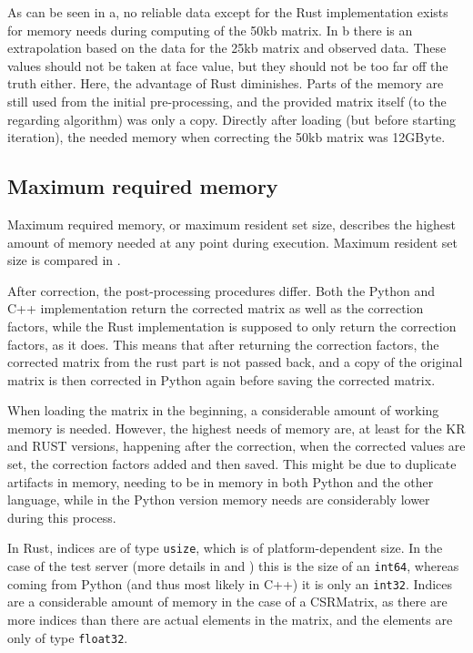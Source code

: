 As can be seen in a, no reliable data except for the Rust
implementation exists for memory needs during computing of the 50kb matrix. In
b there is an extrapolation based on the data for the
25kb matrix and observed data. These values should not be taken at face value,
but they should not be too far off the truth either. Here, the advantage of Rust
diminishes. Parts of the memory are still used from the initial pre-processing,
and the provided matrix itself (to the regarding algorithm) was only a copy.
Directly after loading (but before starting iteration), the needed memory when
correcting the 50kb matrix was 12GByte.


\subsection{Maximum required memory}\label{sec:maxmem}



Maximum required memory, or maximum resident set size, describes the highest
amount of memory needed at any point during execution. Maximum resident set size
is compared in .

After correction, the post-processing procedures differ. Both the Python and
C++ implementation return the corrected matrix as well as the correction
factors, while the Rust implementation is supposed to only return the
correction factors, as it does. This means that after returning the correction
factors, the corrected matrix from the rust part is not passed back, and a copy
of the original matrix is then corrected in Python again before saving the
corrected matrix.

When loading the matrix in the beginning, a considerable amount of working
memory is needed. However, the highest needs of memory are, at least for the KR and
RUST versions, happening after the correction, when the corrected values are
set, the correction factors added and then saved. This might be due to
duplicate artifacts in memory, needing to be in memory in both Python and
the other language, while in the Python version memory needs are considerably
lower during this process.

In Rust, indices are of type \verb|usize|, which is of platform-dependent size.
In the case of the test server (more details in  and
) this is the size of an \verb|int64|, whereas coming from
Python (and thus most likely in C++) it is only an \verb|int32|. Indices are a
considerable amount of memory in the case of a CSRMatrix, as there are more
indices than there are actual elements in the matrix, and the elements are only
of type \verb|float32|.

